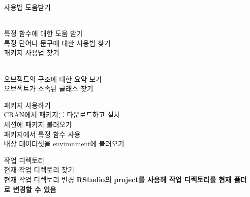 
\begin{block}{사용법 도움받기}
  
  \\특정 함수에 대한 도움 받기\br
  \\특정 단어나 문구에 대한 사용법 찾기\br
  \\패키지 사용법 찾기
  
  \\오브젝트의 구조에 대한 요약 보기\br
  \\오브젝트가 소속된 클래스 찾기
\end{block}

\begin{block}{패키지 사용하기}
  \\CRAN에서 패키지를 다운로드하고 설치\br
  \\세션에 패키지 불러오기\br
  \\패키지에서 특정 함수 사용\br
  \\내장 데이터셋을 environment에 불러오기
\end{block}

\begin{block}{작업 디렉토리}
  \\현재 작업 디렉토리 찾기\br
  \\현재 작업 디렉토리 변경\br
  \textbf{RStudio의 project를 사용해 작업 디렉토리를 현재 폴더로 변경할 수 있음}
\end{block}